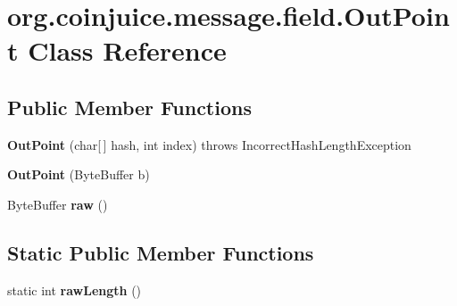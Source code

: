 \hypertarget{classorg_1_1coinjuice_1_1message_1_1field_1_1_out_point}{\section{org.\-coinjuice.\-message.\-field.\-Out\-Point Class Reference}
\label{classorg_1_1coinjuice_1_1message_1_1field_1_1_out_point}
}
\subsection*{Public Member Functions}
\begin{DoxyCompactItemize}
\item 
\hypertarget{classorg_1_1coinjuice_1_1message_1_1field_1_1_out_point_a9d48f64925a0f3efcca6a87ee3970d68}{{\bfseries Out\-Point} (char\mbox{[}$\,$\mbox{]} hash, int index)  throws Incorrect\-Hash\-Length\-Exception }\label{classorg_1_1coinjuice_1_1message_1_1field_1_1_out_point_a9d48f64925a0f3efcca6a87ee3970d68}

\item 
\hypertarget{classorg_1_1coinjuice_1_1message_1_1field_1_1_out_point_a50fb70529c6ebc5a888f230247381748}{{\bfseries Out\-Point} (Byte\-Buffer b)}\label{classorg_1_1coinjuice_1_1message_1_1field_1_1_out_point_a50fb70529c6ebc5a888f230247381748}

\item 
\hypertarget{classorg_1_1coinjuice_1_1message_1_1field_1_1_out_point_a8499222821847e33f71e792b3c4185eb}{Byte\-Buffer {\bfseries raw} ()}\label{classorg_1_1coinjuice_1_1message_1_1field_1_1_out_point_a8499222821847e33f71e792b3c4185eb}

\end{DoxyCompactItemize}
\subsection*{Static Public Member Functions}
\begin{DoxyCompactItemize}
\item 
\hypertarget{classorg_1_1coinjuice_1_1message_1_1field_1_1_out_point_a803396ad709c72254f4da38d7665583d}{static int {\bfseries raw\-Length} ()}\label{classorg_1_1coinjuice_1_1message_1_1field_1_1_out_point_a803396ad709c72254f4da38d7665583d}

\end{DoxyCompactItemize}
